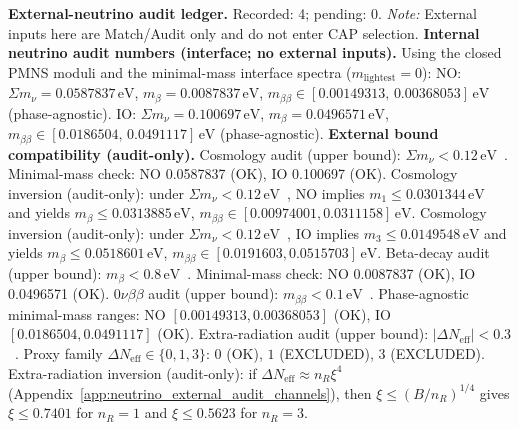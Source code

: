 \textbf{External-neutrino audit ledger.} Recorded: 4; pending: 0.
\textit{Note:} External inputs here are Match/Audit only and do not enter CAP selection.
\textbf{Internal neutrino audit numbers (interface; no external inputs).}
Using the closed PMNS moduli and the minimal-mass interface spectra ($m_\mathrm{lightest}=0$):
NO: $\Sigma m_\nu=0.0587837\,\mathrm{eV}$, $m_\beta=0.0087837\,\mathrm{eV}$, $m_{\beta\beta}\in[0.00149313,\,0.00368053]\,\mathrm{eV}$ (phase-agnostic).
IO: $\Sigma m_\nu=0.100697\,\mathrm{eV}$, $m_\beta=0.0496571\,\mathrm{eV}$, $m_{\beta\beta}\in[0.0186504,\,0.0491117]\,\mathrm{eV}$ (phase-agnostic).
\textbf{External bound compatibility (audit-only).}
Cosmology audit (upper bound): $\Sigma m_\nu < 0.12\,\mathrm{eV}$~\cite{Planck2018Parameters}. Minimal-mass check: NO 0.0587837 (OK), IO 0.100697 (OK).
Cosmology inversion (audit-only): under $\Sigma m_\nu < 0.12\,\mathrm{eV}$~\cite{Planck2018Parameters}, NO implies $m_1\le 0.0301344\,\mathrm{eV}$ and yields $m_\beta\le 0.0313885\,\mathrm{eV}$, $m_{\beta\beta}\in[0.00974001,0.0311158]\,\mathrm{eV}$.
Cosmology inversion (audit-only): under $\Sigma m_\nu < 0.12\,\mathrm{eV}$~\cite{Planck2018Parameters}, IO implies $m_3\le 0.0149548\,\mathrm{eV}$ and yields $m_\beta\le 0.0518601\,\mathrm{eV}$, $m_{\beta\beta}\in[0.0191603,0.0515703]\,\mathrm{eV}$.
Beta-decay audit (upper bound): $m_\beta < 0.8\,\mathrm{eV}$~\cite{PDGRPP2024}. Minimal-mass check: NO 0.0087837 (OK), IO 0.0496571 (OK).
0$\nu\beta\beta$ audit (upper bound): $m_{\beta\beta} < 0.1\,\mathrm{eV}$~\cite{PDGRPP2024}. Phase-agnostic minimal-mass ranges: NO $[0.00149313,0.00368053]$ (OK), IO $[0.0186504,0.0491117]$ (OK).
Extra-radiation audit (upper bound): $|\Delta N_\mathrm{eff}| < 0.3$~\cite{Planck2018Parameters}. Proxy family $\Delta N_\mathrm{eff}\in\{0,1,3\}$: $0$ (OK), $1$ (EXCLUDED), $3$ (EXCLUDED).
Extra-radiation inversion (audit-only): if $\Delta N_\mathrm{eff}\approx n_R\xi^4$ (Appendix~\ref{app:neutrino_external_audit_channels}), then $\xi\le(B/n_R)^{1/4}$ gives $\xi\le 0.7401$ for $n_R=1$ and $\xi\le 0.5623$ for $n_R=3$.